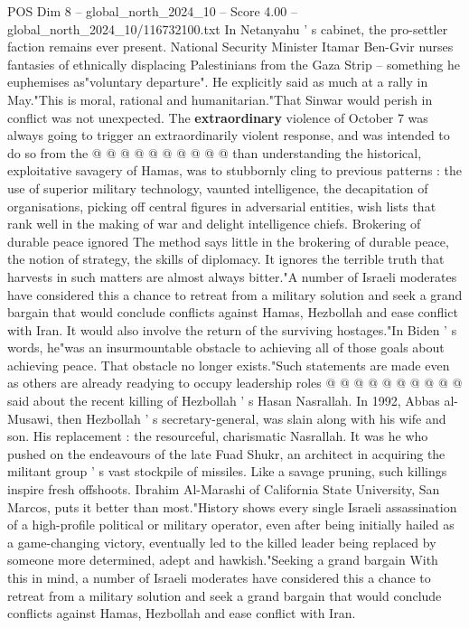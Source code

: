 \begin{textsample}{POS Dim 8 – global\_north\_2024\_10 – Score 4.00 – global\_north\_2024\_10/116732100.txt}
In Netanyahu ' s cabinet, the pro-settler faction remains ever present.
National Security Minister Itamar Ben-Gvir nurses fantasies of ethnically displacing Palestinians from the Gaza Strip -- something he euphemises as"voluntary departure".
He explicitly said as much at a rally in May."This is moral, rational and humanitarian."That Sinwar would perish in conflict was not unexpected.
The \textbf{extraordinary} violence of October 7 was always going to trigger an extraordinarily violent response, and was intended to do so from the @ @ @ @ @ @ @ @ @ @ than understanding the historical, exploitative savagery of Hamas, was to stubbornly cling to previous patterns : the use of superior military technology, vaunted intelligence, the decapitation of organisations, picking off central figures in adversarial entities, wish lists that rank well in the making of war and delight intelligence chiefs.
Brokering of durable peace ignored The method says little in the brokering of durable peace, the notion of strategy, the skills of diplomacy.
It ignores the terrible truth that harvests in such matters are almost always bitter."A number of Israeli moderates have considered this a chance to retreat from a military solution and seek a grand bargain that would conclude conflicts against Hamas, Hezbollah and ease conflict with Iran.
It would also involve the return of the surviving hostages."In Biden ' s words, he"was an insurmountable obstacle to achieving all of those goals about achieving peace.
That obstacle no longer exists."Such statements are made even as others are already readying to occupy leadership roles @ @ @ @ @ @ @ @ @ @ said about the recent killing of Hezbollah ' s Hasan Nasrallah.
In 1992, Abbas al-Musawi, then Hezbollah ' s secretary-general, was slain along with his wife and son.
His replacement : the resourceful, charismatic Nasrallah.
It was he who pushed on the endeavours of the late Fuad Shukr, an architect in acquiring the militant group ' s vast stockpile of missiles.
Like a savage pruning, such killings inspire fresh offshoots.
Ibrahim Al-Marashi of California State University, San Marcos, puts it better than most."History shows every single Israeli assassination of a high-profile political or military operator, even after being initially hailed as a game-changing victory, eventually led to the killed leader being replaced by someone more determined, adept and hawkish."Seeking a grand bargain With this in mind, a number of Israeli moderates have considered this a chance to retreat from a military solution and seek a grand bargain that would conclude conflicts against Hamas, Hezbollah and ease conflict with Iran.

\end{textsample}
